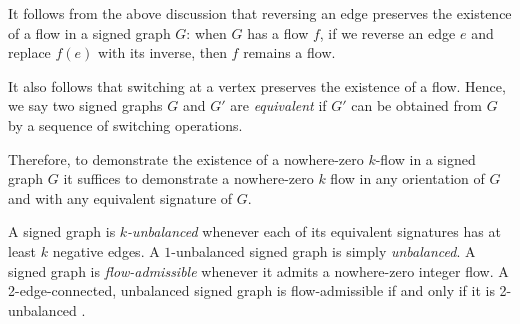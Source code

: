 \documentclass[12pt]{article}
\newcommand{\Z}{\mathbb{Z}}
\begin{document}
It follows from the above discussion that reversing an edge preserves the existence of a flow in a signed graph $G$: when $G$ has a flow $f$, if we reverse an edge $e$ and replace $f(e)$ with its inverse, then $f$ remains a flow. 

It also follows that switching at a vertex preserves the existence of a flow. Hence, we say two signed graphs $G$ and $G'$ are \emph{equivalent} if $G'$ can be obtained from $G$ by a sequence of switching operations. 

Therefore, to demonstrate the existence of a nowhere-zero $k$-flow in a signed graph $G$ it suffices to demonstrate a nowhere-zero $k$ flow in any orientation of $G$ and with any equivalent signature of $G$.

A signed graph is \emph{$k$-unbalanced} whenever each of its equivalent signatures has at least $k$ negative edges. A $1$-unbalanced signed graph is simply \emph{unbalanced}.
A signed graph is \emph{flow-admissible} whenever it admits a nowhere-zero integer flow. A 2-edge-connected, unbalanced signed graph is flow-admissible if and only if it is 2-unbalanced \cite{Bouchet}.


\medskip
\end{document}
